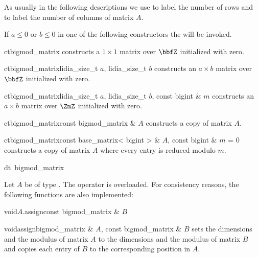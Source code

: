 As usually in the following descriptions we use  to label the number of rows and
 to label the number of columns of matrix $A$.



\CONS

If $a\leq 0$ or $b\leq 0$ in one of the following constructors the \LEH will be invoked.

\begin{fcode}{ct}{bigmod_matrix}{}
  constructs a $1 \times 1$ matrix over $\bbfZ$ initialized with zero.
\end{fcode}

\begin{fcode}{ct}{bigmod_matrix}{lidia_size_t $a$, lidia_size_t $b$}
  constructs an $a \times b$ matrix over $\bbfZ$ initialized with zero.
\end{fcode}

\begin{fcode}{ct}{bigmod_matrix}{lidia_size_t $a$, lidia_size_t $b$, const bigint & $m$}
  constructs an $a \times b$ matrix over $\ZmZ$ initialized with zero.
\end{fcode}

\begin{fcode}{ct}{bigmod_matrix}{const bigmod_matrix & $A$}
  constructs a copy of matrix $A$.
\end{fcode}

\begin{fcode}{ct}{bigmod_matrix}{const base_matrix< bigint > & $A$, const bigint & $m$ = 0}
  constructs a copy of matrix $A$ where every entry is reduced modulo $m$.
\end{fcode}

\begin{fcode}{dt}{~bigmod_matrix}{}
\end{fcode}



\ASGN

Let $A$ be of type .  The operator \code{=} is overloaded.  For consistency
reasons, the following functions are also implemented:

\begin{fcode}{void}{$A$.assign}{const bigmod_matrix & $B$}
\end{fcode}

\begin{fcode}{void}{assign}{bigmod_matrix & $A$, const bigmod_matrix & $B$}
  sets the dimensions and the modulus of matrix $A$ to the dimensions and the modulus of matrix
  $B$ and copies each entry of $B$ to the corresponding position in $A$.
\end{fcode}

